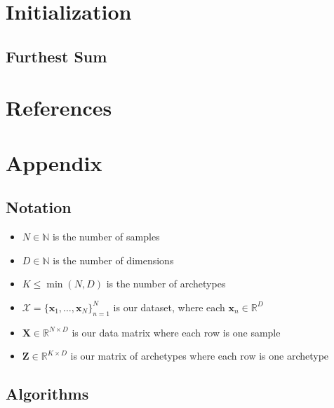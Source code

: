 \documentclass[oneside]{article}
\begin{document}
\section{Initialization}

\subsection{Furthest Sum}

\section{References}

\printbibliography[heading=none]

\section{Appendix}

\subsection{Notation}

\begin{itemize}
    \item $N \in \mathbb{N}$ is the number of samples
    \item $D \in \mathbb{N}$ is the number of dimensions
    \item $K \leq \min(N, D)$ is the number of archetypes
    \item $\mathcal{X}=\{\mathbf{x}_1, \ldots, \mathbf{x}_N\}_{n=1}^N$ is our dataset, where each $\mathbf{x}_n \in \mathbb{R}^D$
    \item $\mathbf{X} \in \mathbb{R}^{N \times D}$ is our data matrix where each row is one sample
    \item $\mathbf{Z} \in \mathbb{R}^{K \times D}$ is our matrix of archetypes where each row is one archetype
\end{itemize}

\subsection{Algorithms}
\end{document}
